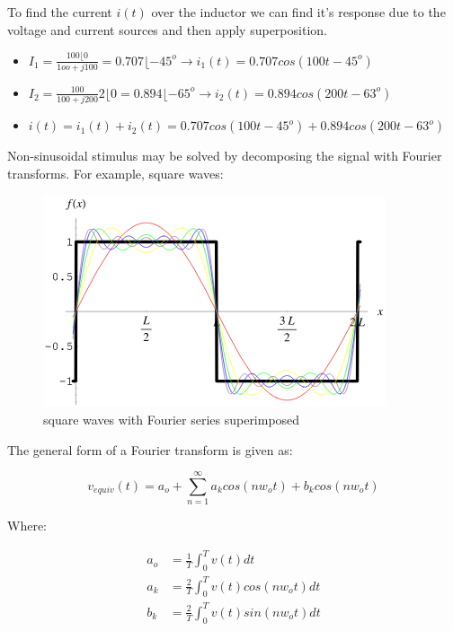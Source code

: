 \documentclass[../notes.tex]{subfiles}
\begin{document}
To find the current $ i(t) $ over the inductor we can find it's response due to the voltage and current sources and then apply superposition.

\begin{itemize}
	\item $ I_1 = \frac{100\lfloor{0}}{1oo + j100} = 0.707\lfloor{-45^o} \rightarrow i_1(t) = 0.707 cos(100t - 45^o) $ 
	\item $ I_2 = \frac{100}{100 + j200} 2\lfloor 0 = 0.894 \lfloor -65^o \rightarrow i_2(t) = 0.894 cos (200t - 63^o)$ 
	\item $ i(t) = i_1(t) + i_2(t) = 0.707cos(100t - 45^o) + 0.894 cos(200t - 63^o) $ 
\end{itemize}

Non-sinusoidal stimulus may be solved by decomposing the signal with Fourier transforms. 
For example, square waves:

\begin{figure}[H]
	\centering
	\includegraphics[width=0.8\linewidth]{img/image_2022-09-12-11-28-11.png}
	\caption{square waves with Fourier series superimposed}
\end{figure}

The general form of a Fourier transform is given as:

\begin{equation}
	v_{equiv}(t) = a_o + \sum^\infty_{n=1} a_k cos(nw_ot) + b_k cos(nw_ot)
	\label{eq:349:fourier}
\end{equation}

Where:

\begin{equation}
	\begin{split}
		a_o &=  \frac{1}{T} \int^T_0 v(t) dt \\
		a_k &= \frac{2}{T} \int^T_0 v(t) cos (nw_o t) dt \\
		b_k &= \frac{2}{T} \int^T_0 v(t) sin(nw_o t) dt \\
	\end{split}
	\label{eq:349:fourier_terms}
\end{equation}
\end{document}
